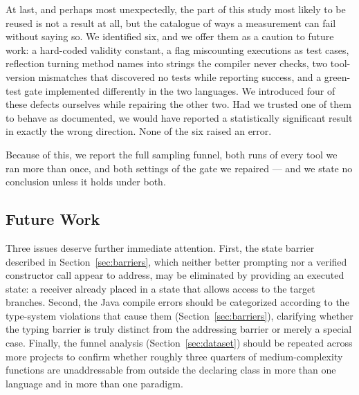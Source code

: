 At last, and perhaps most unexpectedly, the part of this study most likely to be reused is not
a result at all, but the catalogue of ways a measurement can fail without saying so. We
identified six, and we offer them as a caution to future work: a hard-coded validity constant,
a flag miscounting executions as test cases, reflection turning method names into strings the
compiler never checks, two tool-version mismatches that discovered no tests while reporting
success, and a green-test gate implemented differently in the two languages. We introduced four
of these defects ourselves while repairing the other two. Had we trusted one of them to behave
as documented, we would have reported a statistically significant result in exactly the wrong
direction. None of the six raised an error.

Because of this, we report the full sampling funnel, both runs of every tool we ran more than
once, and both settings of the gate we repaired --- and we state no conclusion unless it holds
under both.

\subsection*{Future Work}

Three issues deserve further immediate attention. First, the state barrier described in
Section~\ref{sec:barriers}, which neither better prompting nor a verified constructor call appear
to address, may be eliminated by providing an executed state: a receiver already placed in a
state that allows access to the target branches. Second, the Java compile errors should be
categorized according to the type-system violations that cause them (Section~\ref{sec:barriers}),
clarifying whether the typing barrier is truly distinct from the addressing barrier or merely a
special case. Finally, the funnel analysis (Section~\ref{sec:dataset}) should be repeated across
more projects to confirm whether roughly three quarters of medium-complexity functions are
unaddressable from outside the declaring class in more than one language and in more than one
paradigm.
